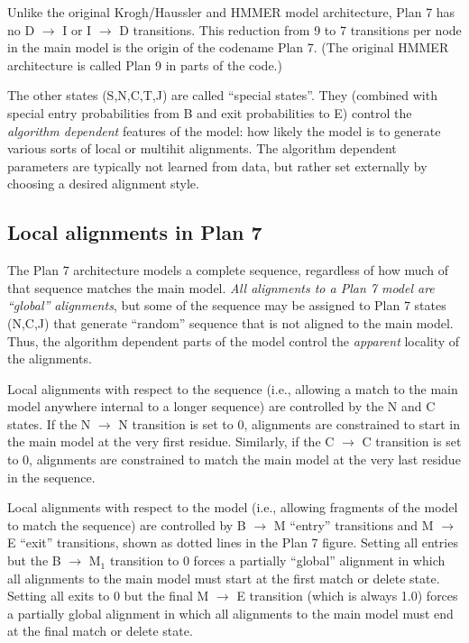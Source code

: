 Unlike the original Krogh/Haussler and HMMER model architecture, Plan
7 has no D $\rightarrow$ I or I $\rightarrow$ D transitions. This
reduction from 9 to 7 transitions per node in the main model is the
origin of the codename Plan 7. (The original HMMER architecture is
called Plan 9 in parts of the code.)

The other states (S,N,C,T,J) are called ``special states''. They
(combined with special entry probabilities from B and exit
probabilities to E) control the \textit{algorithm dependent} features
of the model: how likely the model is to generate various sorts of
local or multihit alignments. The algorithm dependent parameters are
typically not learned from data, but rather set externally by choosing
a desired alignment style.

\subsection{Local alignments in Plan 7}

The Plan 7 architecture models a complete sequence, regardless of how
much of that sequence matches the main model. \textit{All alignments
to a Plan 7 model are ``global'' alignments}, but some of the sequence
may be assigned to Plan 7 states (N,C,J) that generate ``random''
sequence that is not aligned to the main model.  Thus, the algorithm
dependent parts of the model control the \textit{apparent} locality of
the alignments.

Local alignments with respect to the sequence (i.e., allowing a match
to the main model anywhere internal to a longer sequence) are
controlled by the N and C states. If the N $\rightarrow$ N transition
is set to 0, alignments are constrained to start in the main model at
the very first residue. Similarly, if the C $\rightarrow$ C transition
is set to 0, alignments are constrained to match the main model at the
very last residue in the sequence.

Local alignments with respect to the model (i.e., allowing fragments
of the model to match the sequence) are controlled by B $\rightarrow$
M ``entry'' transitions and M $\rightarrow$ E ``exit'' transitions,
shown as dotted lines in the Plan 7 figure. Setting all entries but
the B $\rightarrow$ M$_1$ transition to 0 forces a partially
``global'' alignment in which all alignments to the main model must
start at the first match or delete state. Setting all exits to 0 but
the final M $\rightarrow$ E transition (which is always 1.0) forces a
partially global alignment in which all alignments to the main model
must end at the final match or delete state.


